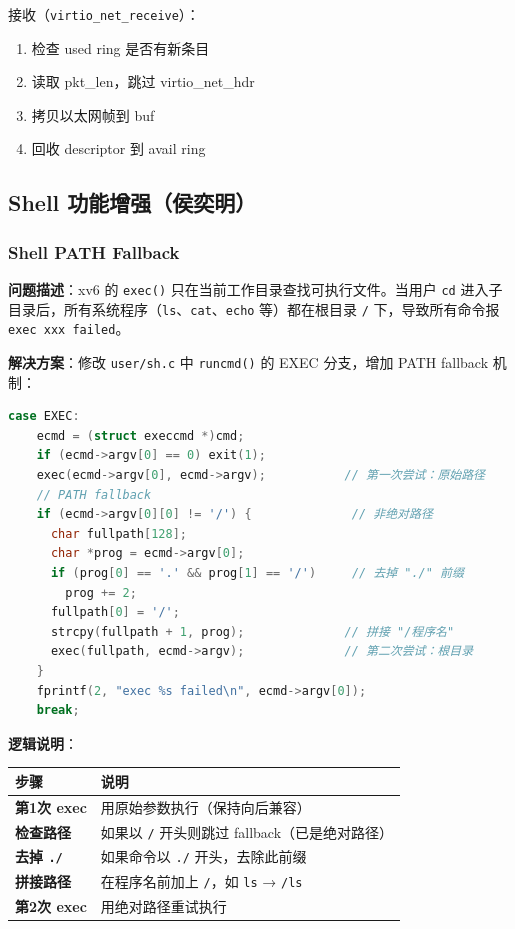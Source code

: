 \documentclass[12pt,a4paper]{ctexart}
\begin{document}
接收（\texttt{virtio\_net\_receive}）：
\begin{enumerate}
  \item 检查 used ring 是否有新条目
  \item 读取 pkt\_len，跳过 virtio\_net\_hdr
  \item 拷贝以太网帧到 buf
  \item 回收 descriptor 到 avail ring
\end{enumerate}

\subsection{Shell 功能增强（侯奕明）}

\subsubsection{Shell PATH Fallback}

\textbf{问题描述}：xv6 的 \texttt{exec()} 只在当前工作目录查找可执行文件。当用户 \texttt{cd} 进入子目录后，所有系统程序（\texttt{ls}、\texttt{cat}、\texttt{echo} 等）都在根目录 \texttt{/} 下，导致所有命令报 \texttt{exec xxx failed}。

\textbf{解决方案}：修改 \texttt{user/sh.c} 中 \texttt{runcmd()} 的 EXEC 分支，增加 PATH fallback 机制：

\begin{lstlisting}[language=C, caption={Shell PATH fallback（user/sh.c:runcmd()）}]
case EXEC:
    ecmd = (struct execcmd *)cmd;
    if (ecmd->argv[0] == 0) exit(1);
    exec(ecmd->argv[0], ecmd->argv);           // 第一次尝试：原始路径
    // PATH fallback
    if (ecmd->argv[0][0] != '/') {              // 非绝对路径
      char fullpath[128];
      char *prog = ecmd->argv[0];
      if (prog[0] == '.' && prog[1] == '/')     // 去掉 "./" 前缀
        prog += 2;
      fullpath[0] = '/';
      strcpy(fullpath + 1, prog);              // 拼接 "/程序名"
      exec(fullpath, ecmd->argv);              // 第二次尝试：根目录
    }
    fprintf(2, "exec %s failed\n", ecmd->argv[0]);
    break;
\end{lstlisting}

\textbf{逻辑说明}：
\begin{table}[H]
\centering
\begin{tabular}{>{\bfseries}p{2.5cm}p{9cm}}
\toprule
\textbf{步骤} & \textbf{说明} \\
\midrule
第1次 exec & 用原始参数执行（保持向后兼容） \\
检查路径    & 如果以 \texttt{/} 开头则跳过 fallback（已是绝对路径） \\
去掉 \texttt{./} & 如果命令以 \texttt{./} 开头，去除此前缀 \\
拼接路径    & 在程序名前加上 \texttt{/}，如 \texttt{ls} → \texttt{/ls} \\
第2次 exec & 用绝对路径重试执行 \\
\bottomrule
\end{tabular}
\end{table}
\end{document}

